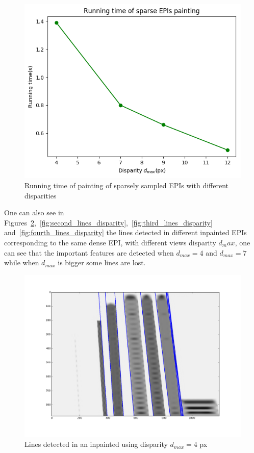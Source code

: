 \begin{itemize}
\begin{figure}[h!]
\centering
\includegraphics[width = 0.7 \textwidth]{./Diagrams/results/Disparity_benchmark/sparse_painting_benchmark.png}
\caption{Running time of painting of sparsely sampled EPIs with different disparities}
\label{fig:benchmark_line}
\end{figure}


\bigskip

One can also see in Figures~\ref{fig:first_lines_disparity},~\ref{fig:second_lines_disparity},~\ref{fig:third_lines_disparity} and~\ref{fig:fourth_lines_disparity} the lines detected in different inpainted EPIs corresponding to the same dense EPI, with different views disparity $d_max$, one can see that the important features are detected when $d_{max}=4$ and $d_{max}=7$ while when $d_{max}$ is bigger some lines are lost. 

\begin{figure}[h!]
\centering
\includegraphics[width = 0.7 \textwidth]{./Diagrams/results/Disparity_benchmark/673_10_102_4_48_8_lines.png}
\caption{Lines detected in an inpainted using disparity $d_{max} = 4$ px}
\label{fig:first_lines_disparity}
\end{figure}


\end{itemize}
